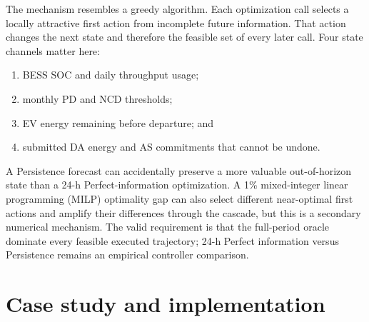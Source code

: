 \documentclass[final,5p,times]{elsarticle}
\begin{document}
The mechanism resembles a greedy algorithm. Each optimization call selects a locally
attractive first action from incomplete future information. That action changes
the next state and therefore the feasible set of every later call. Four state
channels matter here:
\begin{enumerate}
  \item BESS SOC and daily throughput usage;
  \item monthly PD and NCD thresholds;
  \item EV energy remaining before departure; and
  \item submitted DA energy and AS commitments that cannot be undone.
\end{enumerate}
A Persistence forecast can accidentally preserve a more valuable out-of-horizon state than a 24-h Perfect-information optimization. A 1\% mixed-integer linear programming (MILP) optimality gap can also select different near-optimal first actions and amplify their differences through the cascade, but this is a secondary numerical mechanism. The valid requirement is that the full-period oracle dominate every feasible executed trajectory; 24-h Perfect information versus Persistence remains an empirical
controller comparison.


\section{Case study and implementation}
\label{sec:case}
\label{sec:case_study}
\end{document}
